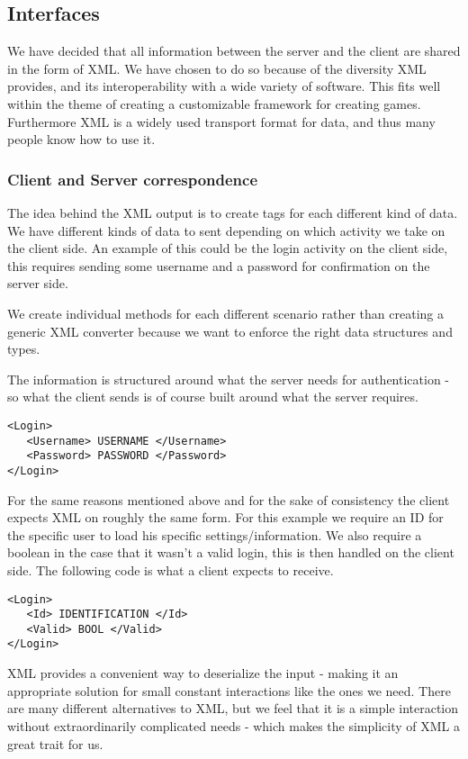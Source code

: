 \subsection{Interfaces}
\label{subsec:interfaces}



We have decided that all information between the server and the client are shared in the form of XML. We have chosen to do so because of the diversity XML provides, and its interoperability with a wide variety of software. This fits well within the theme of creating a customizable framework for creating games. Furthermore XML is a widely used transport format for data, and thus many people know how to use it. %

\subsubsection{Client and Server correspondence}

The idea behind the XML output is to create tags for each different kind of data. We have different kinds of data to sent depending on which activity we take on the client side. An example of this could be the login activity on the client side, this requires sending some username and a password for confirmation on the server side.

We create individual methods for each different scenario rather than creating a generic XML converter because we want to enforce the right data structures and types. 

The information is structured around what the server needs for authentication - so what the client sends is of course built around what the server requires.

\begin{lstlisting}
<Login>
   <Username> USERNAME </Username>
   <Password> PASSWORD </Password>
</Login>
\end{lstlisting}

For the same reasons mentioned above and for the sake of consistency the client expects XML on roughly the same form. For this example we require an ID for the specific user to load his specific settings/information. We also require a boolean in the case that it wasn't a valid login, this is then handled on the client side. The following code is what a client expects to receive.

\begin{lstlisting}
<Login>
   <Id> IDENTIFICATION </Id>
   <Valid> BOOL </Valid>
</Login>
\end{lstlisting}

XML provides a convenient way to deserialize the input - making it an appropriate solution for small constant interactions like the ones we need. There are many different alternatives to XML, but we feel that it is a simple interaction without extraordinarily complicated needs - which makes the simplicity of XML a great trait for us.

%
%